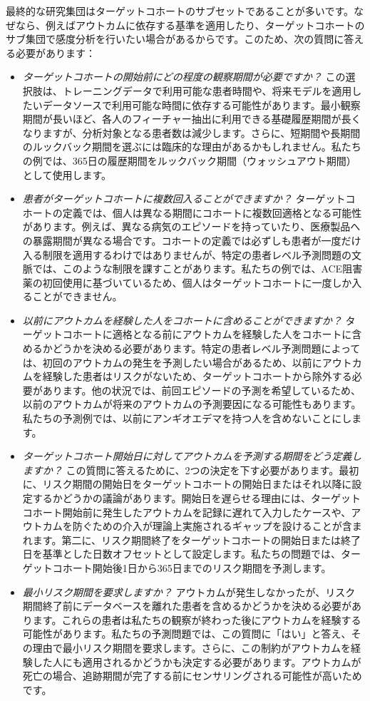 \documentclass[
  11pt]{book}
\theoremstyle{definition}
\theoremstyle{definition}
\theoremstyle{definition}
\theoremstyle{definition}
\theoremstyle{remark}
\begin{document}
最終的な研究集団はターゲットコホートのサブセットであることが多いです。なぜなら、例えばアウトカムに依存する基準を適用したり、ターゲットコホートのサブ集団で感度分析を行いたい場合があるからです。このため、次の質問に答える必要があります：

\begin{itemize}
\item
  \emph{ターゲットコホートの開始前にどの程度の観察期間が必要ですか？} この選択肢は、トレーニングデータで利用可能な患者時間や、将来モデルを適用したいデータソースで利用可能な時間に依存する可能性があります。最小観察期間が長いほど、各人のフィーチャー抽出に利用できる基礎履歴期間が長くなりますが、分析対象となる患者数は減少します。さらに、短期間や長期間のルックバック期間を選ぶには臨床的な理由があるかもしれません。私たちの例では、365日の履歴期間をルックバック期間（ウォッシュアウト期間）として使用します。
\item
  \emph{患者がターゲットコホートに複数回入ることができますか？} ターゲットコホートの定義では、個人は異なる期間にコホートに複数回適格となる可能性があります。例えば、異なる病気のエピソードを持っていたり、医療製品への暴露期間が異なる場合です。コホートの定義では必ずしも患者が一度だけ入る制限を適用するわけではありませんが、特定の患者レベル予測問題の文脈では、このような制限を課すことがあります。私たちの例では、ACE阻害薬の初回使用に基づいているため、個人はターゲットコホートに一度しか入ることができません。
\item
  \emph{以前にアウトカムを経験した人をコホートに含めることができますか？} ターゲットコホートに適格となる前にアウトカムを経験した人をコホートに含めるかどうかを決める必要があります。特定の患者レベル予測問題によっては、初回のアウトカムの発生を予測したい場合があるため、以前にアウトカムを経験した患者はリスクがないため、ターゲットコホートから除外する必要があります。他の状況では、前回エピソードの予測を希望しているため、以前のアウトカムが将来のアウトカムの予測要因になる可能性もあります。私たちの予測例では、以前にアンギオエデマを持つ人を含めないことにします。
\item
  \emph{ターゲットコホート開始日に対してアウトカムを予測する期間をどう定義しますか？} この質問に答えるために、2つの決定を下す必要があります。最初に、リスク期間の開始日をターゲットコホートの開始日またはそれ以降に設定するかどうかの議論があります。開始日を遅らせる理由には、ターゲットコホート開始前に発生したアウトカムを記録に遅れて入力したケースや、アウトカムを防ぐための介入が理論上実施されるギャップを設けることが含まれます。第二に、リスク期間終了をターゲットコホートの開始日または終了日を基準とした日数オフセットとして設定します。私たちの問題では、ターゲットコホート開始後1日から365日までのリスク期間を予測します。
\item
  \emph{最小リスク期間を要求しますか？} アウトカムが発生しなかったが、リスク期間終了前にデータベースを離れた患者を含めるかどうかを決める必要があります。これらの患者は私たちの観察が終わった後にアウトカムを経験する可能性があります。私たちの予測問題では、この質問に「はい」と答え、その理由で最小リスク期間を要求します。さらに、この制約がアウトカムを経験した人にも適用されるかどうかも決定する必要があります。アウトカムが死亡の場合、追跡期間が完了する前にセンサリングされる可能性が高いためです。
\end{itemize}
\end{document}
